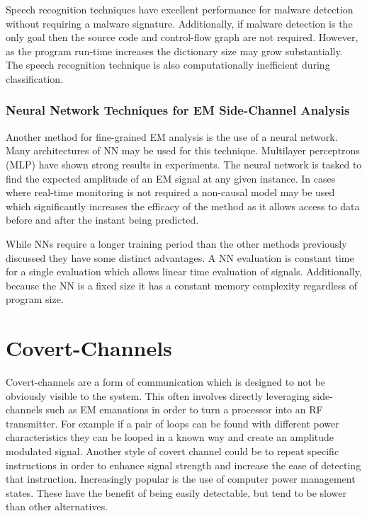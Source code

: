       Speech recognition techniques have excellent performance for malware detection without requiring a malware signature.
      Additionally, if malware detection is the only goal then the source code and control-flow graph are not required.
      However, as the program run-time increases the dictionary size may grow substantially.
      The speech recognition technique is also computationally inefficient during classification.

    \subsubsection{Neural Network Techniques for EM Side-Channel Analysis}
      Another method for fine-grained EM analysis is the use of a neural network.
      Many architectures of NN may be used for this technique. 
      Multilayer perceptrons (MLP) have shown strong results in experiments.
      The neural network is tasked to find the expected amplitude of an EM signal at any given instance.
      In cases where real-time monitoring is not required a non-causal model may be used which significantly increases
        the efficacy of the method as it allows access to data before and after the instant being predicted.

      While NNs require a longer training period than the other methods previously discussed they have some 
        distinct advantages.
      A NN evaluation is constant time for a single evaluation which allows linear time evaluation of signals.
      Additionally, because the NN is a fixed size it has a constant memory complexity regardless of program size.

\section{Covert-Channels}
  Covert-channels are a form of communication which is designed to not be obviously visible to the system.
  This often involves directly leveraging side-channels such as EM emanations in order to turn a processor 
    into an RF transmitter.
  For example if a pair of loops can be found with different power characteristics they can be looped in a known
    way and create an amplitude modulated signal.
  Another style of covert channel could be to repeat specific instructions in order to enhance signal strength
    and increase the ease of detecting that instruction.
  Increasingly popular is the use of computer power management states. 
  These have the benefit of being easily detectable, but tend to be slower than other alternatives.

